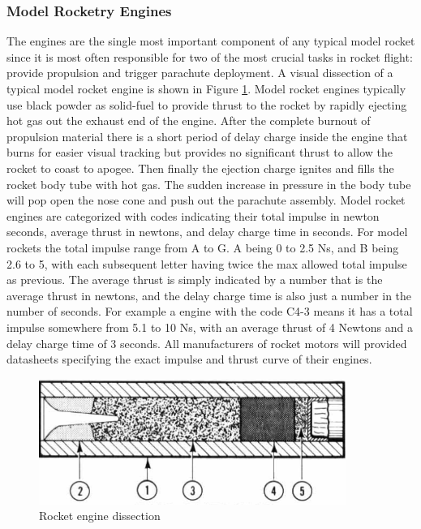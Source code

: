 \documentclass{workreport}
\begin{document}
\begin{body}
\subsubsection{Model Rocketry Engines}

	The engines are the single most important component of any typical model rocket since it is most often responsible for two of the most crucial tasks in rocket flight: provide propulsion and trigger parachute deployment. A visual dissection of a typical model rocket engine is shown in Figure \ref{fig:dissection}. Model rocket engines typically use black powder as solid-fuel to provide thrust to the rocket by rapidly ejecting hot gas out the exhaust end of the engine. After the complete burnout of propulsion material there is a short period of delay charge inside the engine that burns for easier visual tracking but provides no significant thrust to allow the rocket to coast to apogee. Then finally the ejection charge ignites and fills the rocket body tube with hot gas. The sudden increase in pressure in the body tube will pop open the nose cone and push out the parachute assembly. Model rocket engines are categorized with codes indicating their total impulse in newton seconds, average thrust in newtons, and delay charge time in seconds. For model rockets the total impulse range from A to G. A being 0 to 2.5 Ns, and B being 2.6 to 5, with each subsequent letter having twice the max allowed total impulse as previous. The average thrust is simply indicated by a number that is the average thrust in newtons, and the delay charge time is also just a number in the number of seconds.
	For example a engine with the code C4-3 means it has a total impulse somewhere from 5.1 to 10 Ns, with an average thrust of 4 Newtons and a delay charge time of 3 seconds. All manufacturers of rocket motors will provided datasheets specifying the exact impulse and thrust curve of their engines.

	\begin{figure}[!ht]
		\centering
		\includegraphics[width=10cm]{./images/dissection.png}
		\caption{Rocket engine dissection \cite{centuri_manual}}
		\label{fig:dissection}
	\end{figure}


\end{body}
\end{document}
